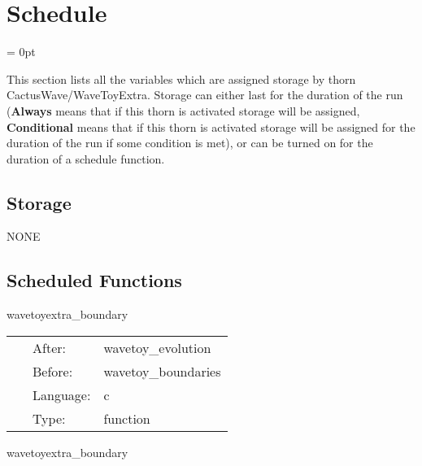 
\section{Schedule} 


\parskip = 0pt


\noindent This section lists all the variables which are assigned storage by thorn CactusWave/WaveToyExtra.  Storage can either last for the duration of the run ({\bf Always} means that if this thorn is activated storage will be assigned, {\bf Conditional} means that if this thorn is activated storage will be assigned for the duration of the run if some condition is met), or can be turned on for the duration of a schedule function.


\subsection*{Storage}NONE
\subsection*{Scheduled Functions}
\vspace{5mm}


\hspace{5mm} wavetoyextra\_boundary 

\hspace{5mm}{\it additional boundary conditions for 3d wave equation } 


\hspace{5mm}

 \begin{tabular*}{160mm}{cll} 
~ & After:  & wavetoy\_evolution \\ 
~ & Before:  & wavetoy\_boundaries \\ 
~ & Language:  & c \\ 
~ & Type:  & function \\ 
\end{tabular*} 


\vspace{5mm}


\hspace{5mm} wavetoyextra\_boundary 

\hspace{5mm}{\it additional boundary conditions for 3d wave equation } 


\hspace{5mm}


